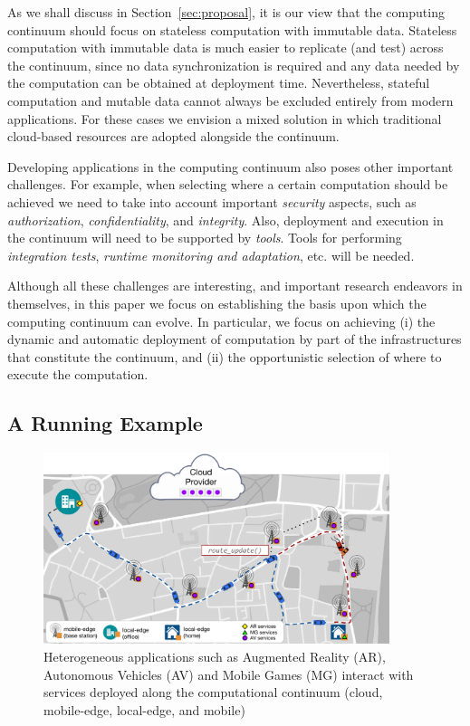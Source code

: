 As we shall discuss in Section~\ref{sec:proposal}, it is our view that the computing continuum should focus on stateless computation with immutable data. Stateless computation with immutable data is much easier to replicate (and test) across the continuum, since no data synchronization is required and any data needed by the computation can be obtained at deployment time. Nevertheless, stateful computation and mutable data cannot always be excluded entirely from modern applications. For these cases we envision a mixed solution in which traditional cloud-based resources are adopted alongside the continuum. 

Developing applications in the computing continuum also poses other important challenges. For example, when selecting where a certain computation should be achieved we need to take into account important \emph{security} aspects, such as \emph{authorization}, \emph{confidentiality}, and \emph{integrity}. Also, deployment and execution in the continuum will need to be supported by \emph{tools}. Tools for performing \emph{integration tests}, \emph{runtime monitoring and adaptation}, etc. will be needed.

Although all these challenges are interesting, and important research endeavors in themselves, in this paper we focus on establishing the basis upon which the computing continuum can evolve. In particular, we focus on achieving (i) the dynamic and automatic deployment of computation by part of the infrastructures that constitute the continuum, and (ii) the opportunistic selection of where to execute the computation.

\subsection{A Running Example}
\label{sub:example}

\begin{figure}[tbp]
	\includegraphics[width=0.9\textwidth]{figs/Continuum-Scenario}
	\caption{Heterogeneous applications such as Augmented Reality (AR), Autonomous Vehicles (AV) and Mobile Games (MG) interact with services deployed along the computational continuum (cloud, mobile-edge, local-edge, and mobile)}
	\label{fig:continuum-scenario}
\end{figure}

